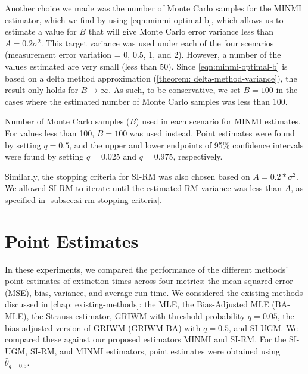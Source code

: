 Another choice we made was the number of Monte Carlo samples for the MINMI estimator, which we find by using \autoref{eqn:minmi-optimal-b}, which allows us to estimate a value for $B$ that will give Monte Carlo error variance less than $A = 0.2\sigma^2$. This target variance was used under each of the four scenarios (measurement error variation = 0, 0.5, 1, and 2). However, a number of the values estimated are very small (less than 50). Since \autoref{eqn:minmi-optimal-b} is based on a delta method approximation (\autoref{theorem: delta-method-variance}), the result only holds for $B \rightarrow \infty$. As such, to be conservative, we set $B=100$ in the cases where the estimated number of Monte Carlo samples was less than 100.
\begin{table}[ht]
    \centering
    \caption{Number of Monte Carlo samples ($B$) used in each scenario for MINMI estimates. For values less than 100, $B = 100$ was used instead. Point estimates were found by setting $q = 0.5$, and the upper and lower endpoints of 95\% confidence intervals were found by setting $q=0.025$ and $q=0.975$, respectively.}
    \vspace{4mm}
    
    \label{tab:table-sim-exp-minmi-Bs}
    \vspace{-4mm}
\end{table}

Similarly, the stopping criteria for SI-RM was also chosen based on $A = 0.2*\sigma^2$. We allowed SI-RM to iterate until the estimated RM variance was less than $A$, as specified in \autoref{subsec:si-rm-stopping-criteria}.

\section{Point Estimates}

In these experiments, we compared the performance of the different methods' point estimates of extinction times across four metrics: the mean squared error (MSE), bias, variance, and average run time. We considered the existing methods discussed in \autoref{chap: existing-methods}: the MLE, the Bias-Adjusted MLE (BA-MLE), the Strauss estimator, GRIWM with threshold probability $q=0.05$, the bias-adjusted version of GRIWM (GRIWM-BA) with $q=0.5$, and SI-UGM. We compared these against our proposed estimators MINMI and SI-RM. For the SI-UGM, SI-RM, and MINMI estimators, point estimates were obtained using $\hat\theta_{q=0.5}$.


